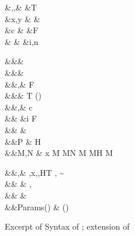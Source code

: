 \documentclass[screen,nonacm,manuscript,review]{acmart} %
\begin{document}
 \begin{figure}[ht]
 \begin{syntax}
  &\TyVar,\beta,\Co &\qquad{} &T \\
  &x,y &\qquad{} &\shl{\NType} \\
  &c &\qquad{} &F\\
                      &  &\qquad{} &i,n \in {}\\
 \end{syntax}
 \begin{syntax}
    &&\rho \bnfeq& \\
    &&\kappa \bnfeq& \star \bnfor \kappa \to \kappa \bnfor \shl{\sigma \sim_\rho \tau}\\
    &&\tau,\sigma \bnfeq& \TyVar \bnfor {} \bnfor
   \tau\App\tau \bnfor \Forall {\TyVar\co\kappa} \tau \bnfor
   F\many\tau \bnfor \Co \\
     &&\TypeConst \bnfeq& T \bnfor (\to) \bnfor \shl{\NType}\\
  &&\nu,\Co \bnfeq& c \bnfor \Refl\tau \bnfor \Sym\Co \bnfor \Trans\nu\Co %
 \bnfor \Forall {\TyVar\co\kappa} \Co \bnfor \Co\At\tau %
 \bnfor \nu\App\Co \\
                  &&              &\bnfor \Left \Co \bnfor \Right \Co \bnfor \Nth i \Co \bnfor \TypeConst\App\many\Co \bnfor F\many\Co \bnfor \shl{\SubCo \Co} \\  %
  && \phi \bnfeq& \tau \bnfor \Co\\
  &&P \bnfeq& H\App \many{\TyVar\co\kappa} \\
  &&M,N \bnfeq& x \bnfor {} M \bnfor M\App N \bnfor \TLam{\tau\co\kappa} M \bnfor M\App \tau \bnfor H \bnfor \Case M  \bnfor \Cast \Tm \Co
 \end{syntax}
 \begin{syntax}
  &&\TEnv,\Delta \bnfeq& \empt \bnfor \TEnv,x\co\tau \bnfor \TEnv,\TyVar\co\kappa \bnfor \TEnv,H\co T \bnfor \TEnv, \Co \co \tau\sim\sigma\\
  && \bnfeq& \empt \bnfor {},\alpha\co\rho\\
                     &&\roles{\TypeConst} \bnfeq& {}\\
                     &&Params(\TypeConst) \bnfeq& \many{\alpha\co\rho}\quad  {} (\TypeConst\App\many\alpha) \co \star%
 \end{syntax}
 \caption{Excerpt of Syntax of \SFR; extension of \SFC}
 \label{fig:sfr-syntax}
 \end{figure}
\end{document}
